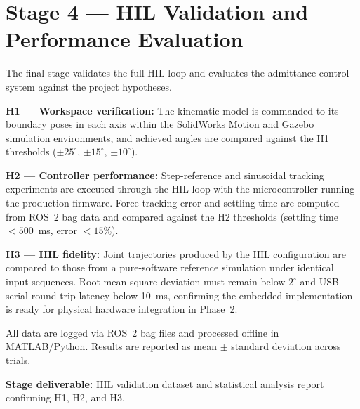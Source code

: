 \section{Stage 4 — HIL Validation and Performance Evaluation}

The final stage validates the full HIL loop and evaluates the admittance control system against the project hypotheses.

\textbf{H1 — Workspace verification:} The kinematic model is commanded to its boundary poses in each axis within the SolidWorks Motion and Gazebo simulation environments, and achieved angles are compared against the H1 thresholds ($\pm25^{\circ}$, $\pm15^{\circ}$, $\pm10^{\circ}$).

\textbf{H2 — Controller performance:} Step-reference and sinusoidal tracking experiments are executed through the HIL loop with the microcontroller running the production firmware.
Force tracking error and settling time are computed from ROS~2 bag data and compared against the H2 thresholds (settling time $<500$~ms, error $<15\%$).

\textbf{H3 — HIL fidelity:} Joint trajectories produced by the HIL configuration are compared to those from a pure-software reference simulation under identical input sequences.
Root mean square deviation must remain below $2^{\circ}$ and USB serial round-trip latency below 10~ms, confirming the embedded implementation is ready for physical hardware integration in Phase~2.

All data are logged via ROS~2 bag files and processed offline in MATLAB/Python.
Results are reported as mean $\pm$ standard deviation across trials.

\textbf{Stage deliverable:} HIL validation dataset and statistical analysis report confirming H1, H2, and H3.

